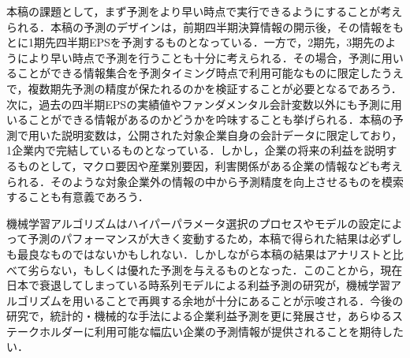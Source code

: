 \documentclass[a4paper，11pt]{jsarticle}
\begin{document}
本稿の課題として，まず予測をより早い時点で実行できるようにすることが考えられる．本稿の予測のデザインは，前期四半期決算情報の開示後，その情報をもとに1期先四半期EPSを予測するものとなっている．一方で，2期先，3期先のようにより早い時点で予測を行うことも十分に考えられる．その場合，予測に用いることができる情報集合を予測タイミング時点で利用可能なものに限定したうえで，複数期先予測の精度が保たれるのかを検証することが必要となるであろう．次に，過去の四半期EPSの実績値やファンダメンタル会計変数以外にも予測に用いることができる情報があるのかどうかを吟味することも挙げられる．本稿の予測で用いた説明変数は，公開された対象企業自身の会計データに限定しており，1企業内で完結しているものとなっている．しかし，企業の将来の利益を説明するものとして，マクロ要因や産業別要因，利害関係がある企業の情報なども考えられる．そのような対象企業外の情報の中から予測精度を向上させるものを模索することも有意義であろう．

機械学習アルゴリズムはハイパーパラメータ選択のプロセスやモデルの設定によって予測のパフォーマンスが大きく変動するため，本稿で得られた結果は必ずしも最良なものではないかもしれない．しかしながら本稿の結果はアナリストと比べて劣らない，もしくは優れた予測を与えるものとなった．このことから，現在日本で衰退してしまっている時系列モデルによる利益予測の研究が，機械学習アルゴリズムを用いることで再興する余地が十分にあることが示唆される．今後の研究で，統計的・機械的な手法による企業利益予測を更に発展させ，あらゆるステークホルダーに利用可能な幅広い企業の予測情報が提供されることを期待したい．






% 

% 


\appendix

\end{document}
